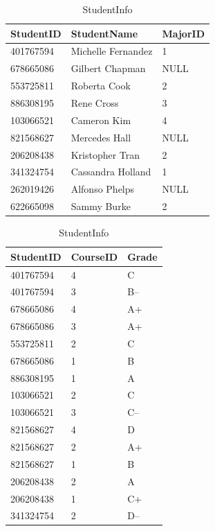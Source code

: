 \begin{table}[H]
\begin{subtable}{0.55\textwidth}
\begin{subtable}{\textwidth}
        \centering
        \footnotesize
        \begin{tabular}{|l|l|l|}
            \hline StudentID & StudentName & MajorID \\ \hline
            401767594 & Michelle Fernandez & 1 \\
            678665086 & Gilbert Chapman & NULL \\
            553725811 & Roberta Cook & 2 \\
            886308195 & Rene Cross & 3 \\
            103066521 & Cameron Kim & 4 \\
            821568627 & Mercedes Hall & NULL \\
            206208438 & Kristopher Tran & 2 \\
            341324754 & Cassandra Holland & 1 \\
            262019426 & Alfonso Phelps & NULL \\
            622665098 & Sammy Burke & 2 \\ \hline
        \end{tabular}
        \caption{StudentInfo}
        \label{table:sql1-student-info}
    \end{subtable}
\end{subtable}
\hfil
\begin{subtable}{.35\textwidth}
    \centering
    \footnotesize
    \begin{tabular}{|l|l|l|}
        \hline StudentID & CourseID & Grade \\ \hline
        401767594 & 4 & C \\
        401767594 & 3 & B-- \\
        678665086 & 4 & A+ \\
        678665086 & 3 & A+ \\
        553725811 & 2 & C \\
        678665086 & 1 & B \\
        886308195 & 1 & A \\
        103066521 & 2 & C \\
        103066521 & 3 & C-- \\
        821568627 & 4 & D \\
        821568627 & 2 & A+ \\
        821568627 & 1 & B \\
        206208438 & 2 & A \\
        206208438 & 1 & C+ \\
        341324754 & 2 & D-- \\

\end{tabular}
\end{subtable}
\end{table}

